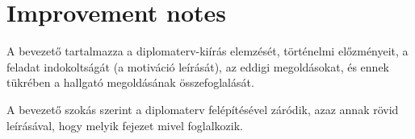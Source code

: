 \chapter{Improvement notes}

A bevezető tartalmazza a diplomaterv-kiírás elemzését, történelmi előzményeit, 
a feladat indokoltságát (a motiváció leírását), az eddigi megoldásokat, 
és ennek tükrében a hallgató megoldásának összefoglalását.

A bevezető szokás szerint a diplomaterv felépítésével záródik, 
azaz annak rövid leírásával, hogy melyik fejezet mivel foglalkozik.

